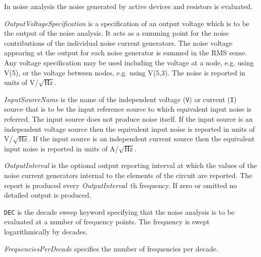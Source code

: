 %
%

In noise  analysis the noise generated by active devices and resistors
is evaluated.



\begin{widelist}
\item[{\it OutputVoltageSpecification}]
     is a specification of an output voltage which is to be the output
     of the noise analysis. It acts as a summing point for the
     noise contributions of the individual noise current generators.
     The noise voltage appearing at the output for each noise generator is summed
     in the RMS sense.
     Any voltage specification may be used including
     the voltage at a node, e.g. using V(5), or the voltage between
     nodes, e.g. using V(5,3).
     The noise is reported in units of V/$\sqrt{\mbox{Hz}}$.

\item[{\it InputSourceName}]
     is the name of the independent voltage ({\tt V}) or current ({\tt I})
     source that is to be the input reference source to which equivalent
     input noise is referred. The input source does not produce noise itself.
     If the input source is an independent voltage source then the equivalent
     input noise is reported in units of V/$\sqrt{\mbox{Hz}}$.
     If the input source is an independent current source then the equivalent
     input noise is reported in units of A/$\sqrt{\mbox{Hz}}$.

\item[{\it OutputInterval}]
     is the optional output reporting interval at which the values of the noise
     current generators internal to the elements of the circuit are reported.
     The report is produced every {\it OutputInterval}~th frequency.
     If zero or omitted no detailed output is produced.

\item[{\tt DEC}] is the decade sweep keyword specifying that the
     noise analysis is to be evaluated at a number of frequency points.
     The frequency is swept logarithmically by decades.

\item[{\it FrequenciesPerDecade}]
     specifies the number of frequencies per decade.

\end{widelist}


